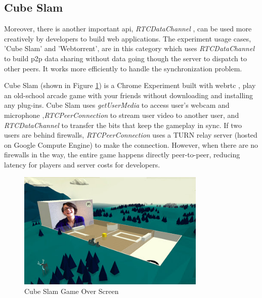 \subsection{Cube Slam}

\noindent Moreover, there is another important \gls{api}, \textit{RTCDataChannel} , can be used more creatively by developers to build web applications. The experiment usage cases, 'Cube Slam' and 'Webtorrent', are in this category which uses \textit{RTCDataChannel} to build \gls{p2p} data sharing without data going though the server to dispatch to other peers. It works more efficiently to handle the synchronization problem.

\par Cube Slam (shown in Figure \ref{fig:cube_slam}) is a Chrome Experiment built with \gls{webrtc} , play an old-school arcade game with your friends without downloading and installing any plug-ins. Cube Slam uses \textit{getUserMedia} to access user's webcam and microphone ,\textit{RTCPeerConnection} to stream user video to another user, and \textit{RTCDataChannel} to transfer the bits that keep the gameplay in sync. If two users are behind firewalls, \textit{RTCPeerConnection} uses a TURN  relay server (hosted on Google Compute Engine) to make the connection. However, when there are no firewalls in the way, the entire game happens directly peer-to-peer, reducing latency for players and server costs for developers.\cite{chrome:cube_slam}

\begin{figure}
	\centering
    	\includegraphics[width=0.8\textwidth,natwidth=610,natheight=642]{figs/cube_slam.jpg}
  	\caption{Cube Slam Game Over Screen}
  	\label{fig:cube_slam}
\end{figure}

